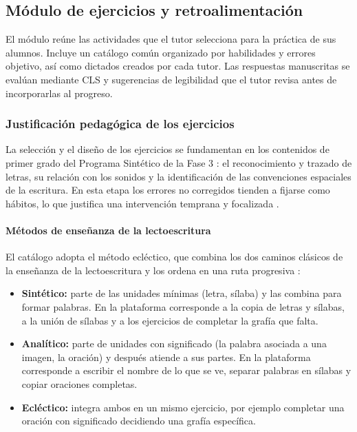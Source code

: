 
\subsection{Módulo de ejercicios y retroalimentación}

El módulo reúne las actividades que el tutor selecciona para la práctica de
sus alumnos. Incluye un catálogo común organizado por habilidades y errores
objetivo, así como dictados creados por cada tutor. Las respuestas manuscritas
se evalúan mediante CLS y sugerencias de legibilidad que el tutor revisa antes
de incorporarlas al progreso.

\subsubsection{Justificación pedagógica de los ejercicios}

La selección y el diseño de los ejercicios se fundamentan en los contenidos de
primer grado del Programa Sintético de la Fase 3 \cite{sep2024fase3}: el
reconocimiento y trazado de letras, su relación con los sonidos y la
identificación de las convenciones espaciales de la escritura. En esta etapa
los errores no corregidos tienden a fijarse como hábitos, lo que justifica una
intervención temprana y focalizada \cite{berninger2010teaching, graham2010handwriting}.

\paragraph{Métodos de enseñanza de la lectoescritura}

El catálogo adopta el método ecléctico, que combina los dos caminos
clásicos de la enseñanza de la lectoescritura y los ordena en una ruta
progresiva \cite{ortega2009eclectico}:

\begin{itemize}
    \item \textbf{Sintético:} parte de las unidades mínimas (letra, sílaba) y
    las combina para formar palabras. En la plataforma corresponde a la copia
    de letras y sílabas, a la unión de sílabas y a los ejercicios de completar
    la grafía que falta.
    \item \textbf{Analítico:} parte de unidades con significado (la palabra
    asociada a una imagen, la oración) y después atiende a sus partes. En la
    plataforma corresponde a escribir el nombre de lo que se ve, separar
    palabras en sílabas y copiar oraciones completas.
    \item \textbf{Ecléctico:} integra ambos en un mismo ejercicio, por ejemplo
    completar una oración con significado decidiendo una grafía específica.
\end{itemize}

